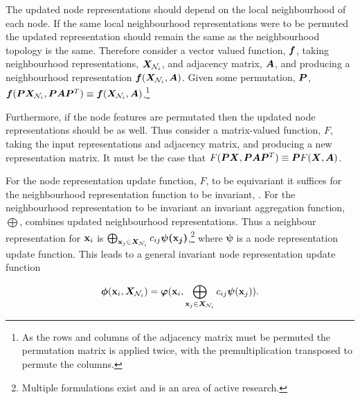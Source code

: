 

The updated node representations should depend on the local neighbourhood of each node.
If the same local neighbourhood representations were to be permuted the updated representation should remain the same as the neighbourhood topology is the same.
Therefore consider a vector valued function, ${\bm{f}}$, taking neighbourhood representations, ${\bm{X}}_{{\mathcal{N}}_i}$, and adjacency matrix, ${\bm{A}}$, and producing a neighbourhood representation ${\bm{f}}({\bm{X}}_{{\mathcal{N}}_i}, {\bm{A}})$.
Given some permutation, ${\bm{P}}$, ${\bm{f}}({\bm{P}}{\bm{X}}_{{\mathcal{N}}_i}, {\bm{P}}{\bm{A}}{\bm{P}}^T) \equiv {\bm{f}}({\bm{X}}_{{\mathcal{N}}_i}, {\bm{A}})$.\footnote{As the rows and columns of the adjacency matrix must be permuted the permutation matrix is applied twice, with the premultiplication transposed to permute the columns.}

Furthermore, if the node features are permutated then the updated node representations should be as well.
Thus consider a matrix-valued function, $F$, taking the input representations and adjacency matrix, and producing a new representation matrix.
It must be the case that $F({\bm{P}}{\bm{X}}, {\bm{P}}{\bm{A}}{\bm{P}}^T) \equiv {\bm{P}} F({\bm{X}}, {\bm{A}})$.

For the node representation update function, $F$, to be equivariant it suffices for the neighbourhood representation function to be invariant, .
For the neighbourhood representation to be invariant an invariant aggregation function, $\bigoplus$, combines updated neighbourhood representations.
Thus a neighbour representation for ${\textbf{x}}_i$ is $\bigoplus_{{\textbf{x}}_j \in {\bm{X}}_{{\mathcal{N}}_i}}c_{ij}\bm{\psi({\textbf{x}}_j)}$,\footnote{Multiple formulations exist and is an area of active research.}
where $\bm{\psi}$ is a node representation update function.
This leads to a general invariant node representation update function

\begin{equation}
    \label{eq:conv-def}
    \bm{\phi}({\textbf{x}}_i, {\bm{X}}_{{\mathcal{N}}_i}) = \bm{\varphi}({\textbf{x}}_i, \bigoplus_{{\textbf{x}}_j \in {\bm{X}}_{{\mathcal{N}}_i}}c_{ij}\bm{\psi}({\textbf{x}}_j)).
\end{equation}



